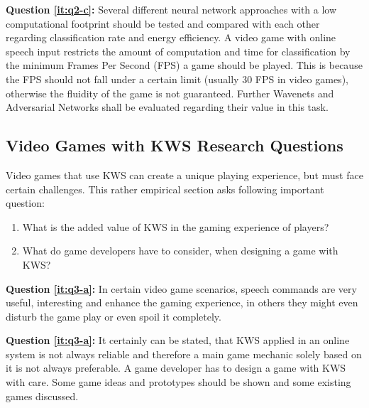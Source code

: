 \textbf{Question \ref{it:q2-c}:}
Several different neural network approaches with a low computational footprint should be tested and compared with each other regarding classification rate and energy efficiency. 
A video game with online speech input restricts the amount of computation and time for classification by the minimum Frames Per Second (FPS) a game should be played.
This is because the FPS should not fall under a certain limit (usually 30 FPS in video games), otherwise the fluidity of the game is not guaranteed.
Further Wavenets and Adversarial Networks shall be evaluated regarding their value in this task.



\subsection{Video Games with KWS Research Questions}\label{sec:intro_rq_games}
Video games that use KWS can create a unique playing experience, but must face certain challenges.
This rather empirical section asks following important question:

\begin{enumerate}[label={Q.3.\alph*)}, leftmargin=1.75cm]
    \item What is the added value of KWS in the gaming experience of players?
    \label{it:q3-a}
    \item What do game developers have to consider, when designing a game with KWS?
    \label{it:q3-b}
    
\end{enumerate}
\noindent
\textbf{Question \ref{it:q3-a}:} %
In certain video game scenarios, speech commands are very useful, interesting and enhance the gaming experience, in others they might even disturb the game play or even spoil it completely.

\textbf{Question \ref{it:q3-a}:} It certainly can be stated, that KWS applied in an online system is not always reliable and therefore a main game mechanic solely based on it is not always preferable.
A game developer has to design a game with KWS with care.
Some game ideas and prototypes should be shown and some existing games discussed.


